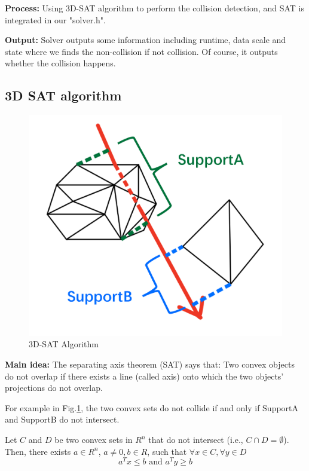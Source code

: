 \documentclass[acmtog]{acmart}
\begin{document}
\textbf{Process:} Using 3D-SAT algorithm to perform the collision detection, and SAT is integrated in our "solver.h".

\textbf{Output:} Solver outputs some information including runtime, data scale and state where we finds the non-collision if not collision. Of course, it outputs whether the collision happens.

\subsection{3D SAT algorithm}
	
	\begin{figure}[h]
		\centering
		\includegraphics[scale=0.1]{sat algorithm.png}
		\caption{3D-SAT Algorithm}
		\label{fig:img4}
	\end{figure}

	
	\textbf{Main idea:} The separating axis theorem (SAT) says that: Two convex objects do not overlap if there exists a line (called axis) onto which the two objects' projections do not overlap. 
	
	\quad For example in Fig.\ref{fig:img4}, the two convex sets do not collide if and only if SupportA and SupportB do not intersect.
	
	\quad Let $C$ and $D$ be two convex sets in $R^n$ that do not intersect (i.e., $C\cap D=\emptyset$). Then, there exists $a\in R^n$, $a\not=0, b\in R$, such that $\forall x\in C,\forall y\in D$
	$$
	a^Tx\le b \text{ and } a^Ty\ge b
	$$
	
\end{document}
